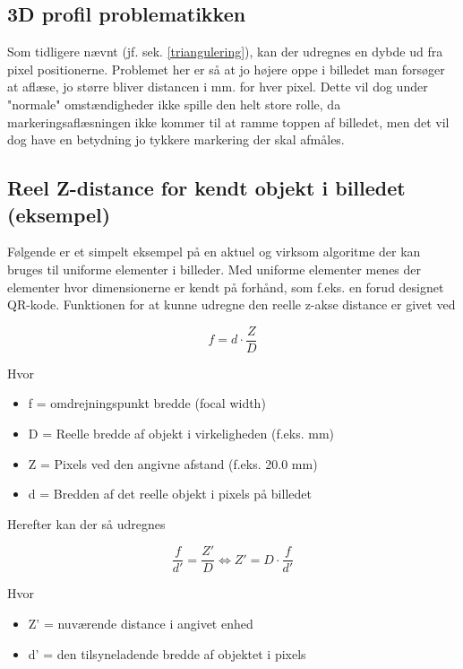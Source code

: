\subsection{3D profil problematikken}

Som tidligere nævnt (jf. sek. \ref{triangulering}), kan der udregnes en dybde ud fra pixel positionerne. Problemet her er så at jo højere oppe i billedet man forsøger at aflæse, jo større bliver distancen i mm. for hver pixel. Dette vil dog under "normale" omstændigheder ikke spille den helt store rolle, da markeringsaflæsningen ikke kommer til at ramme toppen af billedet, men det vil dog have en betydning jo tykkere markering der skal afmåles.

\subsection{Reel Z-distance for kendt objekt i billedet (eksempel)}

Følgende er et simpelt eksempel på en aktuel og virksom algoritme der kan bruges til uniforme elementer i billeder. Med uniforme elementer menes der elementer hvor dimensionerne er kendt på forhånd, som f.eks. en forud designet QR-kode.
Funktionen for at kunne udregne den reelle z-akse distance er givet ved

\begin{equation}
    f = d \cdot \frac{Z}{D}
\end{equation}

Hvor

\begin{itemize}
    \item f = omdrejningspunkt bredde (focal width)
    \item D = Reelle bredde af objekt i virkeligheden (f.eks. mm)
    \item Z = Pixels ved den angivne afstand (f.eks. 20.0 mm)
    \item d = Bredden af det reelle objekt i pixels på billedet
\end{itemize}

Herefter kan der så udregnes

\begin{equation}
    \frac{f}{d'} = \frac{Z'}{D} \Leftrightarrow Z' = D \cdot \frac{f}{d'}
\end{equation}

Hvor

\begin{itemize}
    \item Z' = nuværende distance i angivet enhed 
    \item d' = den tilsyneladende bredde af objektet i pixels
\end{itemize}

